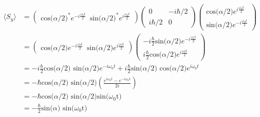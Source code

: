 \begin{equation}
\begin{split}
\langle S_{y} \rangle & = \begin{pmatrix} \textrm{cos($\alpha$/2)}^{*} e^{-i \frac{\omega_{0}t}{2}} \,\,\, \textrm{sin($\alpha$/2)}^{*} e^{i \frac{\omega_{0}t}{2}} \end{pmatrix}  \begin{pmatrix} 0 & -i\hbar/2\\ i\hbar/2 & 0 \end{pmatrix}  \begin{pmatrix} \textrm{cos($\alpha$/2)} e^{i \frac{\omega_{0}t}{2}}\\ \textrm{sin($\alpha$/2)} e^{-i \frac{\omega_{0}t}{2}} \end{pmatrix} \\
& =  \begin{pmatrix} \textrm{cos($\alpha$/2)} e^{-i \frac{\omega_{0}t}{2}} \,\,\, \textrm{sin($\alpha$/2)} e^{i \frac{\omega_{0}t}{2}} \end{pmatrix}  \begin{pmatrix} -i\frac{\hbar}{2}\textrm{sin($\alpha$/2)} e^{-i \frac{\omega_{0}t}{2}} \\ i\frac{\hbar}{2}\textrm{cos($\alpha$/2)} e^{i \frac{\omega_{0}t}{2}} \end{pmatrix} \\
& = -i\frac{\hbar}{2} \textrm{cos($\alpha$/2) sin($\alpha$/2)} e^{-i \omega_{0}t} + i\frac{\hbar}{2} \textrm{sin($\alpha$/2) cos($\alpha$/2)} e^{i \omega_{0}t} \\
& = -\hbar \textrm{cos($\alpha$/2) sin($\alpha$/2)}(\frac{e^{i \omega_{0}t} - e^{-i \omega_{0}t}}{2i}) \\
& = -\hbar \textrm{cos($\alpha$/2) sin($\alpha$/2)} \textrm{sin($\omega_{0}$t)} \\
& = -\frac{\hbar}{2}\textrm{sin($\alpha$) sin($\omega_{0}$t)}
\end{split}
\end{equation}

